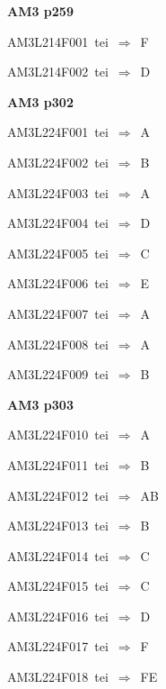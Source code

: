 \par\vfill\eject
{\bf\hfill AM3 p259\hfill\hbox{}}\par\bigskip
{\sixrm AM3L214F001\ {\sixit tei}\ }$\Rightarrow$\ F\par\smallskip
{\sixrm AM3L214F002\ {\sixit tei}\ }$\Rightarrow$\ D\par\smallskip

\par\vfill\eject
{\bf\hfill AM3 p302\hfill\hbox{}}\par\bigskip
{\sixrm AM3L224F001\ {\sixit tei}\ }$\Rightarrow$\ A\par\smallskip
{\sixrm AM3L224F002\ {\sixit tei}\ }$\Rightarrow$\ B\par\smallskip
{\sixrm AM3L224F003\ {\sixit tei}\ }$\Rightarrow$\ A\par\smallskip
{\sixrm AM3L224F004\ {\sixit tei}\ }$\Rightarrow$\ D\par\smallskip
{\sixrm AM3L224F005\ {\sixit tei}\ }$\Rightarrow$\ C\par\smallskip
{\sixrm AM3L224F006\ {\sixit tei}\ }$\Rightarrow$\ E\par\smallskip
{\sixrm AM3L224F007\ {\sixit tei}\ }$\Rightarrow$\ A\par\smallskip
{\sixrm AM3L224F008\ {\sixit tei}\ }$\Rightarrow$\ A\par\smallskip
{\sixrm AM3L224F009\ {\sixit tei}\ }$\Rightarrow$\ B\par\smallskip

\par\vfill\eject
{\bf\hfill AM3 p303\hfill\hbox{}}\par\bigskip
{\sixrm AM3L224F010\ {\sixit tei}\ }$\Rightarrow$\ A\par\smallskip
{\sixrm AM3L224F011\ {\sixit tei}\ }$\Rightarrow$\ B\par\smallskip
{\sixrm AM3L224F012\ {\sixit tei}\ }$\Rightarrow$\ AB\par\smallskip
{\sixrm AM3L224F013\ {\sixit tei}\ }$\Rightarrow$\ B\par\smallskip
{\sixrm AM3L224F014\ {\sixit tei}\ }$\Rightarrow$\ C\par\smallskip
{\sixrm AM3L224F015\ {\sixit tei}\ }$\Rightarrow$\ C\par\smallskip
{\sixrm AM3L224F016\ {\sixit tei}\ }$\Rightarrow$\ D\par\smallskip
{\sixrm AM3L224F017\ {\sixit tei}\ }$\Rightarrow$\ F\par\smallskip
{\sixrm AM3L224F018\ {\sixit tei}\ }$\Rightarrow$\ FE\par\smallskip

